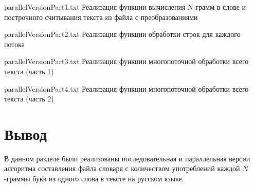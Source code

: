 {parallelVersionPart1.txt} %
{Реализация функции вычисления N-грамм в слове и построчного считывания текста из файла с преобразованиями} %

\clearpage

{parallelVersionPart2.txt} %
{Реализация функции обработки строк для каждого потока} %

\clearpage

{parallelVersionPart3.txt} %
{Реализация функции многопоточной обработки всего текста (часть 1)} %

{parallelVersionPart4.txt} %
{Реализация функции многопоточной обработки всего текста (часть 2)} %

\section*{Вывод}

В данном разделе были реализованы последовательная и параллельная версии алгоритма составления файла словаря с количеством употреблений каждой $N$-граммы букв из одного слова в тексте на русском языке.

    